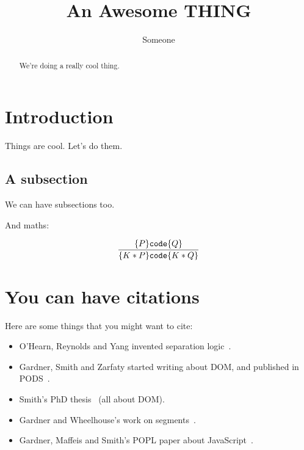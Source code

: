 \documentclass{article}
\begin{document}
\title{An Awesome THING}

\author{Someone}

\maketitle

\begin{abstract}
We're doing a really cool thing.
\end{abstract}

\section{Introduction}

Things are cool. Let's do them.

\subsection{A subsection}

We can have subsections too.

And maths:

\[
\frac{\{P\} \mbox{\texttt{{\upshape code}}} \{Q\}}
{\{K \mathbin{*} P\} \mbox{\texttt{{\upshape code}}} \{K \mathbin{*} Q\}}
\]
\section{You can have citations}

Here are some things that you might want to cite:

\begin{itemize}
\item O'Hearn, Reynolds and Yang invented separation logic~\cite{DBLP:conf/csl/OHearnRY01}.

\item Gardner, Smith and Zarfaty started writing about DOM, and published in
PODS~\cite{Gardner08DOM}.

\item Smith's PhD thesis~\cite{Smith2010} (all about DOM).

\item Gardner and Wheelhouse's work on segments~\cite{segments}.

\item Gardner, Maffeis and Smith's POPL paper about JavaScript~\cite{gms-popl,gms-popl-proofs}.
\end{itemize}



\end{document}
